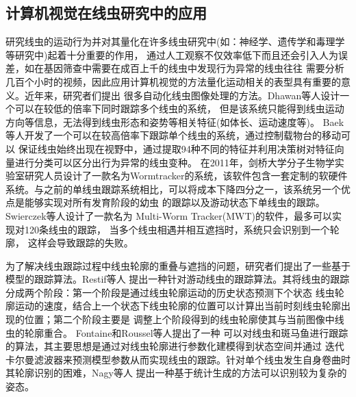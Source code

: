 	
\subsection{计算机视觉在线虫研究中的应用}
\label{sec:intro:analog}
	研究线虫的运动行为并对其量化在许多线虫研究中(如：神经学、遗传学和毒理学等研究中)起着十分重要的作用，
	通过人工观察不仅效率低下而且还会引入人为误差，如在基因筛查中需要在成百上千的线虫中发现行为异常的线虫往往
	需要分析几百个小时的视频，因此应用计算机视觉的方法量化运动相关的表型具有重要的意义。近年来，研究者们提出
	很多自动化线虫图像处理的方法。Dhawan等人\cite{De1998Natural}设计一个可以在较低的倍率下同时跟踪多个线虫的系统，
	但是该系统只能得到线虫运动方向等信息，无法得到线虫形态和姿势等相关特征(如体长、运动速度等)。
	Baek等人\cite{Baek2002Using}开发了一个可以在较高倍率下跟踪单个线虫的系统，通过控制载物台的移动可以
	保证线虫始终出现在视野中，通过提取94种不同的特征并利用决策树对特征向量进行分类可以区分出行为异常的线虫变种。
	在2011年，剑桥大学分子生物学实验室研究人员设计了一款名为Wormtracker的系统，该软件包含一套定制的软硬件
	系统\cite{yemini2013high}。与之前的单线虫跟踪系统相比，可以将成本下降四分之一，该系统另一个优点是能够实现对所有发育阶段的幼虫
	的跟踪以及游动状态下单线虫的跟踪。Swierczek等人\cite{swierczek2011high}设计了一款名为
	Multi-Worm Tracker(MWT)的软件，最多可以实现对120条线虫的跟踪，
	当多个线虫相遇并相互遮挡时，系统只会识别到一个轮廓，
	这样会导致跟踪的失败。
	
	为了解决线虫跟踪过程中线虫轮廓的重叠与遮挡的问题，研究者们提出了一些基于模型的跟踪算法。Restif等人\cite{restif2008tracking}
	提出一种针对游动线虫的跟踪算法。其将线虫的跟踪分成两个阶段：第一个阶段是通过线虫轮廓运动的历史状态预测下个状态
	线虫轮廓运动的速度，结合上一个状态下线虫轮廓的位置可以计算出当前时刻线虫轮廓出现的位置；第二个阶段主要是
	调整上个阶段得到的线虫轮廓使其与当前图像中线虫的轮廓重合。 Fontaine和Roussel等人\cite{fontaine2007model,roussel2014robust}提出了一种
	可以对线虫和斑马鱼进行跟踪的算法，其主要思想是通过对线虫轮廓进行参数化建模得到状态空间并通过
	迭代卡尔曼滤波器来预测模型参数从而实现线虫的跟踪。针对单个线虫发生自身卷曲时其轮廓识别的困难，Nagy等人
	\cite{nagy2015generative}提出一种基于统计生成的方法可以识别较为复杂的姿态。
	
